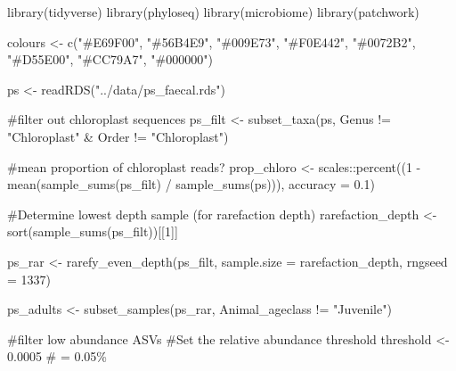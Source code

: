 \documentclass[
  letterpaper,
  DIV=11,
  numbers=noendperiod]{scrartcl}
\newenvironment{Shaded}{\begin{snugshade}}{\end{snugshade}}
\newcommand{\AttributeTok}[1]{\textcolor[rgb]{0.40,0.45,0.13}{#1}}
\newcommand{\CommentTok}[1]{\textcolor[rgb]{0.37,0.37,0.37}{#1}}
\newcommand{\DecValTok}[1]{\textcolor[rgb]{0.68,0.00,0.00}{#1}}
\newcommand{\FloatTok}[1]{\textcolor[rgb]{0.68,0.00,0.00}{#1}}
\newcommand{\FunctionTok}[1]{\textcolor[rgb]{0.28,0.35,0.67}{#1}}
\newcommand{\NormalTok}[1]{\textcolor[rgb]{0.00,0.23,0.31}{#1}}
\newcommand{\OtherTok}[1]{\textcolor[rgb]{0.00,0.23,0.31}{#1}}
\newcommand{\SpecialCharTok}[1]{\textcolor[rgb]{0.37,0.37,0.37}{#1}}
\newcommand{\StringTok}[1]{\textcolor[rgb]{0.13,0.47,0.30}{#1}}
\begin{document}
\begin{Shaded}
\begin{Highlighting}[]
\FunctionTok{library}\NormalTok{(tidyverse)}
\FunctionTok{library}\NormalTok{(phyloseq)}
\FunctionTok{library}\NormalTok{(microbiome)}
\FunctionTok{library}\NormalTok{(patchwork)}

\NormalTok{colours }\OtherTok{\textless{}{-}} \FunctionTok{c}\NormalTok{(}\StringTok{"\#E69F00"}\NormalTok{, }\StringTok{"\#56B4E9"}\NormalTok{, }\StringTok{"\#009E73"}\NormalTok{, }\StringTok{"\#F0E442"}\NormalTok{, }
             \StringTok{"\#0072B2"}\NormalTok{, }\StringTok{"\#D55E00"}\NormalTok{, }\StringTok{"\#CC79A7"}\NormalTok{, }\StringTok{"\#000000"}\NormalTok{)}

\NormalTok{ps }\OtherTok{\textless{}{-}} \FunctionTok{readRDS}\NormalTok{(}\StringTok{"../data/ps\_faecal.rds"}\NormalTok{)}

\CommentTok{\#filter out chloroplast sequences}
\NormalTok{ps\_filt }\OtherTok{\textless{}{-}} \FunctionTok{subset\_taxa}\NormalTok{(ps, Genus }\SpecialCharTok{!=} \StringTok{"Chloroplast"} \SpecialCharTok{\&}\NormalTok{ Order }\SpecialCharTok{!=} \StringTok{"Chloroplast"}\NormalTok{)}

\CommentTok{\#mean proportion of chloroplast reads?}
\NormalTok{prop\_chloro }\OtherTok{\textless{}{-}}\NormalTok{ scales}\SpecialCharTok{::}\FunctionTok{percent}\NormalTok{((}\DecValTok{1} \SpecialCharTok{{-}} \FunctionTok{mean}\NormalTok{(}\FunctionTok{sample\_sums}\NormalTok{(ps\_filt) }\SpecialCharTok{/} \FunctionTok{sample\_sums}\NormalTok{(ps))), }\AttributeTok{accuracy =} \FloatTok{0.1}\NormalTok{)}

\CommentTok{\#Determine lowest depth sample (for rarefaction depth)}
\NormalTok{rarefaction\_depth }\OtherTok{\textless{}{-}} \FunctionTok{sort}\NormalTok{(}\FunctionTok{sample\_sums}\NormalTok{(ps\_filt))[[}\DecValTok{1}\NormalTok{]]}

\NormalTok{ps\_rar }\OtherTok{\textless{}{-}} \FunctionTok{rarefy\_even\_depth}\NormalTok{(ps\_filt, }
                            \AttributeTok{sample.size =}\NormalTok{ rarefaction\_depth, }
                            \AttributeTok{rngseed =} \DecValTok{1337}\NormalTok{)}

\NormalTok{ps\_adults }\OtherTok{\textless{}{-}} \FunctionTok{subset\_samples}\NormalTok{(ps\_rar, Animal\_ageclass }\SpecialCharTok{!=} \StringTok{"Juvenile"}\NormalTok{)}


\CommentTok{\#filter low abundance ASVs}
\CommentTok{\#Set the relative abundance threshold}
\NormalTok{threshold }\OtherTok{\textless{}{-}} \FloatTok{0.0005} \CommentTok{\# = 0.05\%}


\end{Highlighting}
\end{Shaded}
\end{document}
